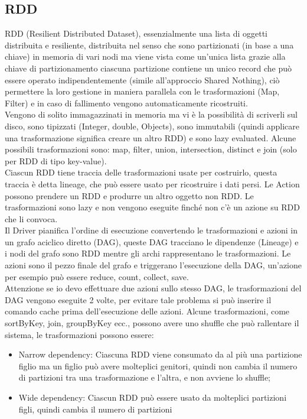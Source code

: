 \documentclass[11pt, twocolumn]{article}
\newenvironment{myitemize}
{ \begin{itemize}[topsep=0ex]
		\setlength{\itemsep}{0pt}
		\setlength{\parskip}{0pt}
		\setlength{\parsep}{0pt}     }
	{ \end{itemize}                  }
\begin{document}
\subsection{RDD}
RDD (Resilient Distributed Dataset), essenzialmente una lista di oggetti distribuita e resiliente, distribuita nel senso che sono partizionati (in base a una chiave) in memoria di vari nodi ma viene vista come un'unica lista grazie alla chiave di partizionamento ciascuna partizione contiene un unico record che può essere operato indipendentemente (simile all'approccio Shared Nothing), ciò permettere la loro gestione in maniera parallela con le trasformazioni (Map, Filter) e in caso di fallimento vengono automaticamente ricostruiti.\\
Vengono di solito immagazzinati in memoria ma vi è la possibilità di scriverli sul disco, sono tipizzati (Integer, double, Objects), sono immutabili (quindi applicare una trasformazione significa creare un altro RDD) e sono lazy evaluated. Alcune possibili trasformazioni sono: map, filter, union, intersection, distinct e join (solo per RDD di tipo key-value).\\
Ciascun RDD tiene traccia delle trasformazioni usate per costruirlo, questa traccia è detta lineage, che può essere usato per ricostruire i dati persi. 
Le Action possono prendere un RDD e produrre un altro oggetto non RDD. 
Le trasformazioni sono lazy e non vengono eseguite finché non c'è un azione su RDD che li convoca. \\
Il Driver pianifica l'ordine di esecuzione convertendo le trasformazioni e azioni in un grafo aciclico diretto (DAG), queste DAG tracciano le dipendenze (Lineage) e i nodi del grafo sono RDD mentre gli archi rappresentano le trasformazioni.
Le azioni sono il pezzo finale del grafo e triggerano l'esecuzione della DAG, un'azione per esempio può essere reduce, count, collect, save.\\
Attenzione se io devo effettuare due azioni sullo stesso DAG, le trasformazioni del DAG vengono eseguite 2 volte, per evitare tale problema si può inserire il comando cache prima dell'esecuzione delle azioni. 
Alcune trasformazioni, come sortByKey, join, groupByKey ecc., possono avere uno shuffle che può rallentare il sistema, le trasformazioni possono essere:
\begin{myitemize}
	\item Narrow dependency: Ciascuna RDD viene consumato da al più una partizione figlio ma un figlio può avere molteplici genitori, quindi non cambia il numero di partizioni tra una trasformazione e l'altra, e non avviene lo shuffle;
	\item Wide dependency: Ciascun RDD può essere usato da molteplici partizioni figli, quindi cambia il numero di partizioni
\end{myitemize}
\end{document}
